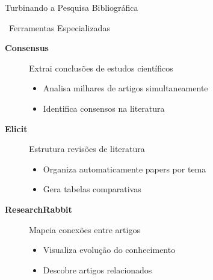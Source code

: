 \documentclass[aspectratio=169,12pt]{beamer}
\begin{document}
\begin{frame}{Turbinando a Pesquisa Bibliográfica}
    \begin{block}{\faSearch\, Ferramentas Especializadas}
        \begin{description}
            \item[\textcolor{accent}{\faChartLine} \textbf{Consensus}] Extrai conclusões de estudos científicos
            \begin{itemize}
                \item Analisa milhares de artigos simultaneamente
                \item Identifica consensos na literatura
            \end{itemize}
            
            \item[\textcolor{secondary}{\faSitemap} \textbf{Elicit}] Estrutura revisões de literatura
            \begin{itemize}
                \item Organiza automaticamente papers por tema
                \item Gera tabelas comparativas
            \end{itemize}
            
            \item[\textcolor{success}{\faLink} \textbf{ResearchRabbit}] Mapeia conexões entre artigos
            \begin{itemize}
                \item Visualiza evolução do conhecimento
                \item Descobre artigos relacionados
            \end{itemize}
        \end{description}
    \end{block}
\end{frame}
\end{document}
